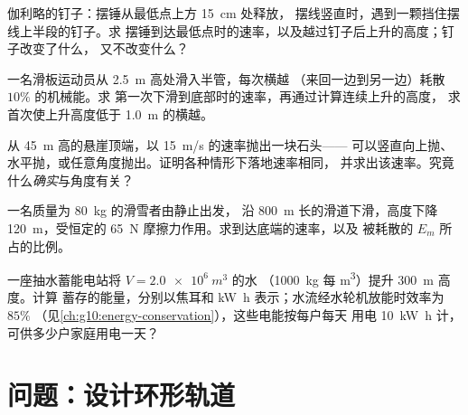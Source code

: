 \begin{exercise}[$\star\star$]\label{exo:g11:mechanical-energy:11}
伽利略的钉子：摆锤从最低点上方 \qty{15}{cm} 处释放，
摆线竖直时，遇到一颗挡住摆线上半段的钉子。求
摆锤到达最低点时的速率，以及越过钉子后上升的高度；钉子改变了什么，
又不改变什么？
\end{exercise}

\begin{exercise}[$\star\star\star$]\label{exo:g11:mechanical-energy:12}
一名滑板运动员从 \qty{2.5}{m} 高处滑入半管，每次横越
（来回一边到另一边）耗散 $10\%$ 的机械能。求
第一次下滑到底部时的速率，再通过计算连续上升的高度，
求首次使上升高度低于 \qty{1.0}{m} 的横越。
\end{exercise}

\begin{exercise}[$\star\star\star$]\label{exo:g11:mechanical-energy:13}
从 \qty{45}{m} 高的悬崖顶端，以 \qty{15}{m/s} 的速率抛出一块石头——
可以竖直向上抛、水平抛，或任意角度抛出。证明各种情形下落地速率相同，
并求出该速率。究竟什么\emph{确实}与角度有关？
\end{exercise}

\begin{exercise}[$\star\star\star$]\label{exo:g11:mechanical-energy:14}
一名质量为 \qty{80}{kg} 的滑雪者由静止出发，
沿 \qty{800}{m} 长的滑道下滑，高度下降 \qty{120}{m}，受恒定的 \qty{65}{N}
摩擦力作用。求到达底端的速率，以及
被耗散的 $E_m$ 所占的比例。
\end{exercise}

\begin{exercise}[$\star\star\star$]\label{exo:g11:mechanical-energy:15}
一座抽水蓄能电站将 $V = \qty{2.0e6}{m^3}$ 的水
（\qty{1000}{kg} 每 \unit{m^3}）提升 \qty{300}{m} 高度。计算
蓄存的能量，分别以焦耳和 \unit{kW.h} 表示；水流经水轮机放能时效率为 $85\%$
（见\cref{ch:g10:energy-conservation}），这些电能按每户每天
用电 \qty{10}{kW.h} 计，可供多少户家庭用电一天？
\end{exercise}

\section{问题：设计环形轨道}

